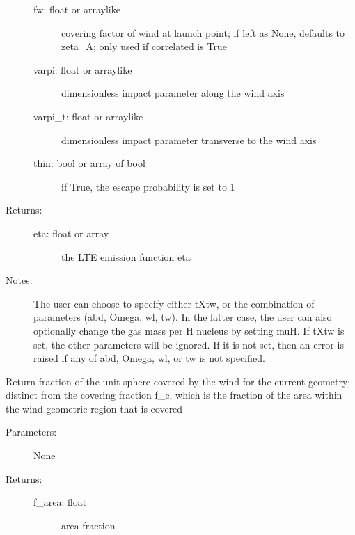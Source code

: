 \documentclass[letterpaper,10pt,english]{sphinxmanual}
\begin{document}
\begin{fulllineitems}
\begin{fulllineitems}
\begin{description}
\begin{description}
\item[{fw: float or arraylike}] \leavevmode
covering factor of wind at launch point; if left as
None, defaults to zeta\_A; only used if correlated is True

\item[{varpi: float or arraylike}] \leavevmode
dimensionless impact parameter along the wind axis

\item[{varpi\_t: float or arraylike}] \leavevmode
dimensionless impact parameter transverse to the wind axis

\item[{thin: bool or array of bool}] \leavevmode
if True, the escape probability is set to 1

\end{description}

\item[{Returns:}] \leavevmode\begin{description}
\item[{eta: float or array}] \leavevmode
the LTE emission function eta

\end{description}

\item[{Notes:}] \leavevmode
The user can choose to specify either tXtw, or the
combination of parameters (abd, Omega, wl, tw). In the
latter case, the user can also optionally change the gas
mass per H nucleus by setting muH. If tXtw is set, the
other parameters will be ignored. If it is not set, then an
error is raised if any of abd, Omega, wl, or tw is not
specified.

\end{description}

\end{fulllineitems}


\begin{fulllineitems}
\label{fulldoc:despotic.winds.pwind.f_area}
Return fraction of the unit sphere covered by the wind for the
current geometry; distinct from the covering fraction f\_c,
which is the fraction of the area within the wind geometric
region that is covered
\begin{description}
\item[{Parameters:}] \leavevmode
None

\item[{Returns:}] \leavevmode\begin{description}
\item[{f\_area: float}] \leavevmode
area fraction


\end{description}
\end{description}
\end{fulllineitems}
\end{fulllineitems}
\end{document}
